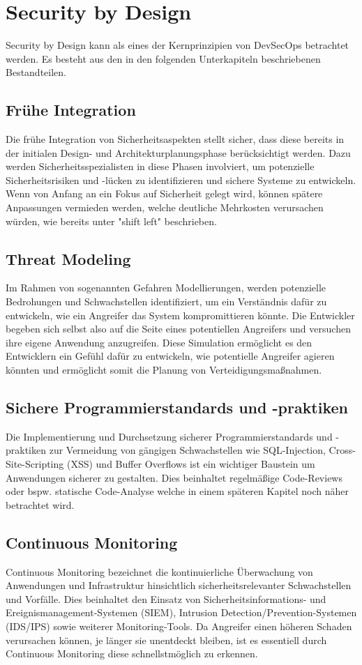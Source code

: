 \section{Security by Design}
Security by Design kann als eines der Kernprinzipien von DevSecOps betrachtet werden. Es besteht aus den in den folgenden Unterkapiteln beschriebenen Bestandteilen.

\subsection{Frühe Integration}
Die frühe Integration von Sicherheitsaspekten stellt sicher, dass diese bereits in der initialen Design- und Architekturplanungsphase berücksichtigt werden. Dazu werden Sicherheitsspezialisten in diese Phasen involviert, um potenzielle Sicherheitsrisiken und -lücken zu identifizieren und sichere Systeme zu entwickeln. Wenn von Anfang an ein Fokus auf Sicherheit gelegt wird, können spätere Anpassungen vermieden werden, welche deutliche Mehrkosten verursachen würden, wie bereits unter "shift left" beschrieben.

\subsection{Threat Modeling}
Im Rahmen von sogenannten Gefahren Modellierungen,  werden potenzielle Bedrohungen und Schwachstellen identifiziert, um ein Verständnis dafür zu entwickeln, wie ein Angreifer das System kompromittieren könnte. Die Entwickler begeben sich selbst also auf die Seite eines potentiellen Angreifers und versuchen ihre eigene Anwendung anzugreifen. Diese Simulation ermöglicht es den Entwicklern ein Gefühl dafür zu entwickeln, wie potentielle Angreifer agieren könnten und ermöglicht somit die Planung von Verteidigungsmaßnahmen.

\subsection{Sichere Programmierstandards und -praktiken}
Die Implementierung und Durchsetzung sicherer Programmierstandards und -praktiken zur Vermeidung von gängigen Schwachstellen wie SQL-Injection, Cross-Site-Scripting (XSS) und Buffer Overflows ist ein wichtiger Baustein um Anwendungen sicherer zu gestalten. Dies beinhaltet regelmäßige Code-Reviews oder bspw. statische Code-Analyse welche in einem späteren Kapitel noch näher betrachtet wird.

\subsection{Continuous Monitoring}
Continuous Monitoring bezeichnet die kontinuierliche Überwachung von Anwendungen und Infrastruktur hinsichtlich sicherheitsrelevanter Schwachstellen und Vorfälle. Dies beinhaltet den Einsatz von Sicherheitsinformations- und Ereignismanagement-Systemen (SIEM), Intrusion Detection/Prevention-Systemen (IDS/IPS) sowie weiterer Monitoring-Tools. Da Angreifer einen höheren Schaden verursachen können, je länger sie unentdeckt bleiben, ist es essentiell durch Continuous Monitoring diese schnellstmöglich zu erkennen.

